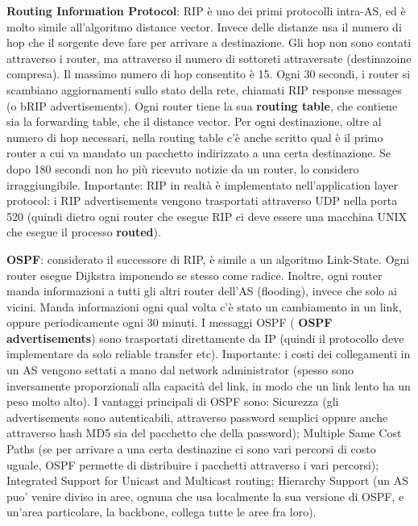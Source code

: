 \documentclass[a4paper,10pt]{article} %
\renewcommand{\b}[1]{%
    {\textbf{#1}}}
\begin{document}
\b{Routing Information Protocol}: RIP è uno dei primi protocolli intra-AS, ed è molto simile all'algoritmo distance vector. Invece delle distanze usa il numero di hop che il sorgente deve fare per arrivare a destinazione. Gli hop non sono contati attraverso i router, ma attraverso il numero di sottoreti attraversate (destinazoine compresa). Il massimo numero di hop consentito è 15. Ogni 30 secondi, i router si scambiano aggiornamenti sullo stato della rete, chiamati RIP response messages (o b{RIP advertisements}). Ogni router tiene la sua \b{routing table}, che contiene sia la forwarding table, che il distance vector. Per ogni destinazione, oltre al numero di hop necessari, nella routing table c'è anche scritto qual è il primo router a cui va mandato un pacchetto indirizzato a una certa destinazione. Se dopo 180 secondi non ho più ricevuto notizie da un router, lo considero irraggiungibile. Importante: RIP in realtà è implementato nell'application layer protocol: i RIP advertisements vengono trasportati attraverso UDP nella porta 520 (quindi dietro ogni router che esegue RIP ci deve essere una macchina UNIX che esegue il processo \b{routed}).

\b{OSPF}: considerato il successore di RIP, è simile a un algoritmo Link-State. Ogni router esegue Dijkstra imponendo se stesso come radice. Inoltre, ogni router manda informazioni a tutti gli altri router dell'AS (flooding), invece che solo ai vicini. Manda informazioni ogni qual volta c'è stato un cambiamento in un link, oppure periodicamente ogni 30 minuti. I messaggi OSPF (\b{OSPF advertisements}) sono trasportati direttamente da IP (quindi il protocollo deve implementare da solo reliable transfer etc). Importante: i costi dei collegamenti in un AS vengono settati a mano dal network administrator (spesso sono inversamente proporzionali alla capacità del link, in modo che un link lento ha un peso molto alto). I vantaggi principali di OSPF sono: Sicurezza (gli advertisements sono autenticabili, attraverso password semplici oppure anche attraverso hash MD5 sia del pacchetto che della password); Multiple Same Cost Paths (se per arrivare a una certa destinazine ci sono vari percorsi di costo uguale, OSPF permette di distribuire i pacchetti attraverso i vari percorsi); Integrated Support for Unicast and Multicast routing; Hierarchy Support (un AS puo' venire diviso in aree, ognuna che usa localmente la sua versione di OSPF, e un'area particolare, la backbone, collega tutte le aree fra loro).
\end{document}
